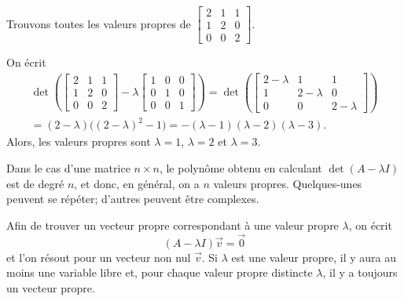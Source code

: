 \begin{example}
Trouvons toutes les valeurs propres de
$\left[ \begin{smallmatrix}
2 & 1 & 1 \\
1 & 2 & 0 \\
0 & 0 & 2
\end{smallmatrix} \right]$.

On écrit
\begin{multline*}
\det \left(
\begin{bmatrix}
2 & 1 & 1 \\
1 & 2 & 0 \\
0 & 0 & 2
\end{bmatrix}
- \lambda 
\begin{bmatrix}
1 & 0 & 0 \\
0 & 1 & 0 \\
0 & 0 & 1
\end{bmatrix}
\right)
=
\det \left(
\begin{bmatrix}
2-\lambda & 1 & 1 \\
1 & 2-\lambda & 0 \\
0 & 0 & 2-\lambda
\end{bmatrix}
\right)
\\
=
(2-\lambda) \bigl({(2-\lambda)}^2 - 1\bigr)
= 
-(\lambda -1)(\lambda -2)(\lambda-3) .
\end{multline*}
Alors, les valeurs propres sont $\lambda = 1$, $\lambda = 2$ et
$\lambda = 3$.
\end{example}

Dans le cas d'une matrice $n \times n$, le polynôme obtenu en calculant $\det(A - \lambda I)$ est de degré $n$, et donc, en général, on a $n$ valeurs propres. Quelques-unes peuvent se répéter; d'autres peuvent être complexes.

\medskip

Afin de trouver un vecteur propre correspondant à une valeur propre $\lambda$, on écrit
\begin{equation*}
(A-\lambda I) \vec{v} = \vec{0} 
\end{equation*}
et l'on résout pour un vecteur non nul $\vec{v}$.
Si $\lambda$ est une valeur propre, il y aura au moins une variable libre et, pour chaque valeur propre distincte $\lambda$, il y a toujours un vecteur propre.

